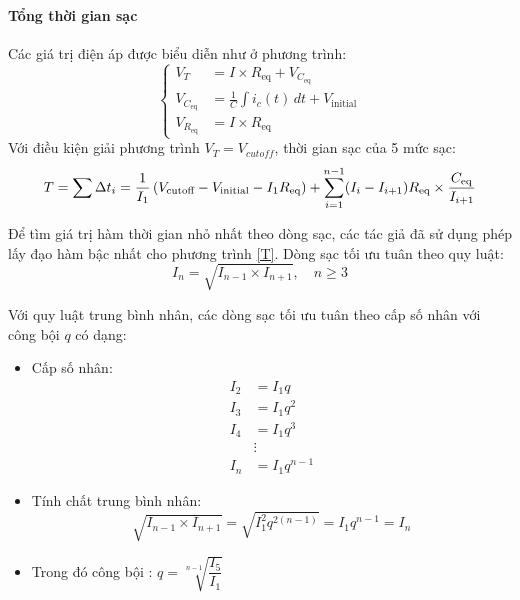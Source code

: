 \documentclass{thesis}
\begin{document}
\paragraph{Tổng thời gian sạc} \mbox


Các giá trị điện áp được biểu diễn như ở phương trình: 
\[
\left\{
\begin{aligned}
    V_T &= I \times R_{\text{eq}} + V_{C_{\text{eq}}} \\
    V_{C_{\text{eq}}} &= \frac{1}{C} \int i_c(t)\,dt + V_{\text{initial}} \\
    V_{R_{\text{eq}}} &= I \times R_{\text{eq}}
\end{aligned}
\right.
\]
Với điều kiện giải phương trình $V_T=V_{cutoff}$, thời gian sạc của 5 mức sạc: 
\begin{equation}
    T = \sum \Delta t_i \\
 = \frac{1}{I_1} \left( V_{\text{cutoff}} - V_{\text{initial}} - I_1 R_{\text{eq}} \right)
+ \sum_{i=1}^{n-1} (I_i - I_{i+1}) R_{\text{eq}} \times \frac{C_{\text{eq}}}{I_{i+1}}
\label{T}
\end{equation}



Để tìm giá trị hàm thời gian nhỏ nhất theo dòng sạc, các tác giả đã sử dụng phép lấy đạo hàm bậc nhất cho phương trình \ref{T}. Dòng sạc tối ưu tuân theo quy luật: 
\begin{equation}
\label{eq:optimal_current}
I_n = \sqrt{I_{n-1} \times I_{n+1}}, \quad n \geq 3
\end{equation}

Với quy luật trung bình nhân, các dòng sạc tối ưu tuân theo cấp số nhân với công bội $q$ có dạng: 
\begin{itemize}
  \item Cấp số nhân:
  \[
  \begin{aligned}
    I_2 &= I_1 q \\
    I_3 &= I_1 q^2 \\
    I_4 &= I_1 q^3 \\
        &\vdots \\
    I_n &= I_1 q^{n-1}
  \end{aligned}
  \]

  \item Tính chất trung bình nhân:
  \[
  \sqrt{I_{n-1} \times I_{n+1}} = \sqrt{I_1^2 q^{2(n-1)}} = I_1 q^{n-1} = I_n
  \]
  \item Trong đó công bội : $q = \sqrt[n-1]{\dfrac{I_5}{I_1}}$
\end{itemize}
\end{document}
